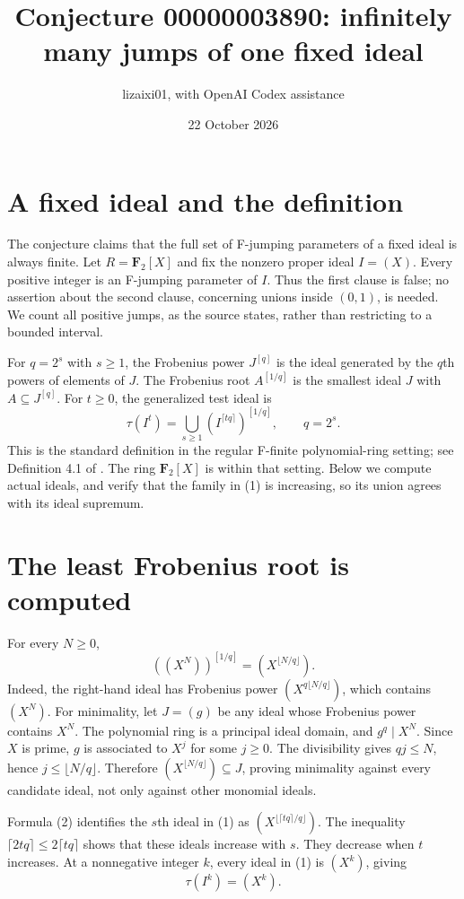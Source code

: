 \documentclass[11pt]{article}
\title{Conjecture 00000003890: infinitely many jumps of one fixed ideal}
\author{lizaixi01, with OpenAI Codex assistance}
\date{22 October 2026}
\begin{document}
\maketitle
\section{A fixed ideal and the definition}
The conjecture claims that the full set of F-jumping parameters of a
fixed ideal is always finite. Let $R=\mathbf F_2[X]$ and fix the nonzero
proper ideal $I=(X)$. Every positive integer is an F-jumping parameter
of $I$. Thus the first clause is false; no assertion about the second
clause, concerning unions inside $(0,1)$, is needed. We count all positive
jumps, as the source states, rather than restricting to a bounded interval.

For $q=2^s$ with $s\geq1$, the Frobenius power $J^{[q]}$ is the ideal
generated by the $q$th powers of elements of $J$. The Frobenius root
$A^{[1/q]}$ is the smallest ideal $J$ with $A\subseteq J^{[q]}$.
For $t\geq0$, the generalized test ideal is
\[
 \tau(I^t)=\bigcup_{s\geq1}(I^{\lceil tq\rceil})^{[1/q]},
 \qquad q=2^s.                                          \tag{1}
\]
This is the standard definition in the regular F-finite polynomial-ring
setting; see Definition 4.1 of \cite{BC}. The ring $\mathbf F_2[X]$ is
within that setting. Below we compute actual ideals, and verify that the
family in (1) is increasing, so its union agrees with its ideal supremum.

\section{The least Frobenius root is computed}
For every $N\geq0$,
\[
 ((X^N))^{[1/q]}=(X^{\lfloor N/q\rfloor}).                \tag{2}
\]
Indeed, the right-hand ideal has Frobenius power
$(X^{q\lfloor N/q\rfloor})$, which contains $(X^N)$.
For minimality, let $J=(g)$ be any ideal whose Frobenius power contains
$X^N$. The polynomial ring is a principal ideal domain, and
$g^q\mid X^N$. Since $X$ is prime, $g$ is associated to $X^j$ for some
$j\geq0$. The divisibility gives $qj\leq N$, hence
$j\leq\lfloor N/q\rfloor$. Therefore
$(X^{\lfloor N/q\rfloor})\subseteq J$, proving minimality against every
candidate ideal, not only against other monomial ideals.

Formula (2) identifies the $s$th ideal in (1) as
$(X^{\lfloor\lceil tq\rceil/q\rfloor})$.
The inequality $\lceil2tq\rceil\leq2\lceil tq\rceil$ shows that these
ideals increase with $s$. They decrease when $t$ increases.
At a nonnegative integer $k$, every ideal in (1) is $(X^k)$, giving
\[
 \tau(I^k)=(X^k).                                       \tag{3}
\]
\end{document}
